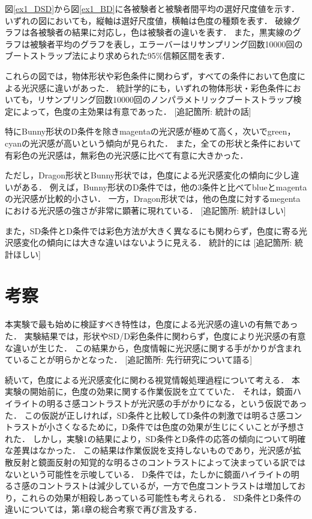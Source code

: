             図\ref{ex1_DSD}から図\ref{ex1_BD}に各被験者と被験者間平均の選好尺度値を示す．
            いずれの図においても，縦軸は選好尺度値，横軸は色度の種類を表す．
            破線グラフは各被験者の結果に対応し，色は被験者の違いを表す．
            また，黒実線のグラフは被験者平均のグラフを表し，エラーバーはリサンプリング回数10000回のブートストラップ法により求められた95\%信頼区間を表す．

            これらの図では，物体形状や彩色条件に関わらず，すべての条件において色度による光沢感に違いがあった．
            統計学的にも，いずれの物体形状・彩色条件においても，リサンプリング回数10000回のノンパラメトリックブートストラップ検定によって，色度の主効果は有意であった．
            [追記箇所: 統計の話]

            特にBunny形状のD条件を除きmagentaの光沢感が極めて高く，次いでgreen，cyanの光沢感が高いという傾向が見られた．
            また，全ての形状と条件において有彩色の光沢感は，無彩色の光沢感に比べて有意に大きかった．


            ただし，Dragon形状とBunny形状では，色度による光沢感変化の傾向に少し違いがある．
            例えば，Bunny形状のD条件では，他の3条件と比べてblueとmagentaの光沢感が比較的小さい．
            一方，Dragon形状では，他の色度に対するmegentaにおける光沢感の強さが非常に顕著に現れている．
            [追記箇所: 統計ほしい]

            また，SD条件とD条件では彩色方法が大きく異なるにも関わらず，色度に寄る光沢感変化の傾向には大きな違いはないように見える．
            統計的には
            [追記箇所: 統計ほしい]


    \section{考察}
        本実験で最も始めに検証すべき特性は，色度による光沢感の違いの有無であった．
        実験結果では，形状やSD/D彩色条件に関わらず，色度により光沢感の有意な違いが生じた．
        この結果から，色度情報に光沢感に関する手がかりが含まれていることが明らかとなった．
        [追記箇所: 先行研究について語る]

        続いて，色度による光沢感変化に関わる視覚情報処理過程について考える．
        本実験の開始前に，色度の効果に関する作業仮説を立てていた．
        それは，鏡面ハイライトの明るさ感コントラストが光沢感の手がかりになる，という仮説であった．
        この仮説が正しければ，SD条件と比較してD条件の刺激では明るさ感コントラストが小さくなるために，D条件では色度の効果が生じにくいことが予想された．
        しかし，実験1の結果により，SD条件とD条件の応答の傾向について明確な差異はなかった．
        この結果は作業仮説を支持しないものであり，光沢感が拡散反射と鏡面反射の知覚的な明るさのコントラストによって決まっている訳ではないという可能性を示唆している．
        D条件では，たしかに鏡面ハイライトの明るさ感のコントラストは減少しているが，一方で色度コントラストは増加しており，これらの効果が相殺しあっている可能性も考えられる．
        SD条件とD条件の違いについては，第4章の総合考察で再び言及する．

